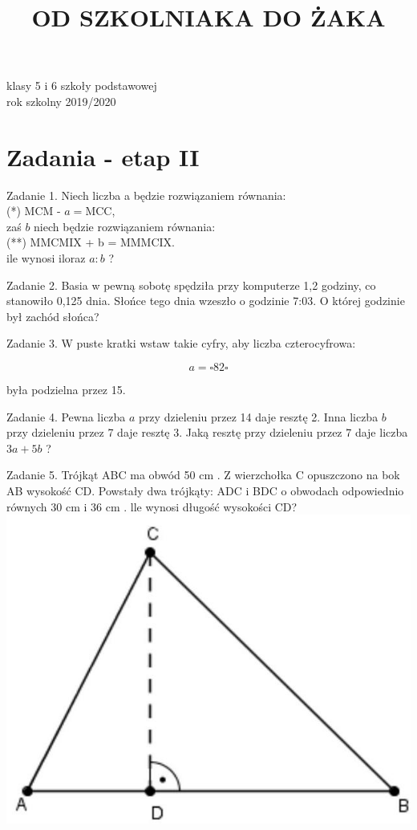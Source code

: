 \documentclass[10pt]{article}
\title{OD SZKOLNIAKA DO ŻAKA }
\author{}
\date{}
\begin{document}
\maketitle
klasy 5 i 6 szkoły podstawowej\\
rok szkolny 2019/2020

\section*{Zadania - etap II}
Zadanie 1. Niech liczba a będzie rozwiązaniem równania:\\
(*) MCM - \(a=\mathrm{MCC}\),\\
zaś \(b\) niech będzie rozwiązaniem równania:\\
(**) MMCMIX + b = MMMCIX.\\
ile wynosi iloraz \(a: b\) ?

Zadanie 2. Basia w pewną sobotę spędziła przy komputerze 1,2 godziny, co stanowiło 0,125 dnia. Słońce tego dnia wzeszło o godzinie 7:03. O której godzinie był zachód słońca?

Zadanie 3. W puste kratki wstaw takie cyfry, aby liczba czterocyfrowa:

\[
a=\square 82 \square
\]

była podzielna przez 15.

Zadanie 4. Pewna liczba \(a\) przy dzieleniu przez 14 daje resztę 2. Inna liczba \(b\) przy dzieleniu przez 7 daje resztę 3. Jaką resztę przy dzieleniu przez 7 daje liczba \(3 a+5 b\) ?

Zadanie 5. Trójkąt ABC ma obwód 50 cm . Z wierzchołka C opuszczono na bok AB wysokość CD. Powstały dwa trójkąty: ADC i BDC o obwodach odpowiednio równych 30 cm i 36 cm . lle wynosi długość wysokości CD?\\
\includegraphics[max width=\textwidth, center]{2024_11_21_0dc2004b6b3d757b48b9g-1}
\end{document}
